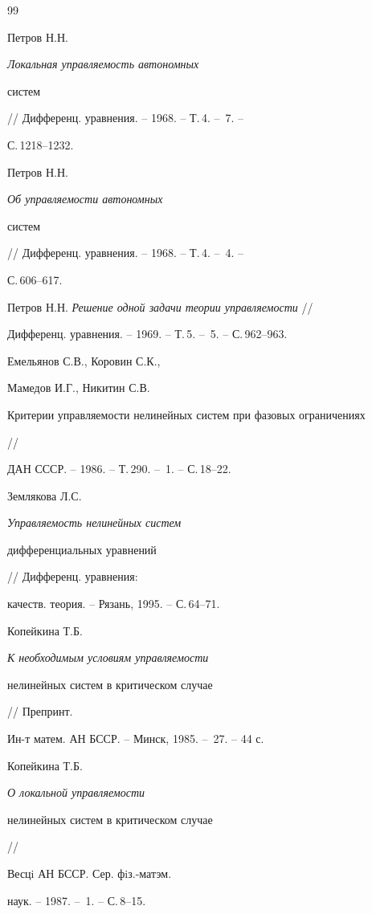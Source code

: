 \begin{thebibliography}{99}







Петров Н.Н. {\em Локальная управляемость автономных


систем} // Дифференц. уравнения. -- 1968. -- Т.\,4. -- \No\,7. --


С.\,1218--1232.




Петров Н.Н. {\em Об управляемости автономных


систем} // Дифференц. уравнения. -- 1968. -- Т.\,4. -- \No\,4. --


С.\,606--617.




Петров Н.Н. {\em Решение одной задачи теории управляемости} //


Дифференц. уравнения. -- 1969. -- Т.\,5. -- \No\,5. -- С.\,962--963.




Емельянов С.В., Коровин С.К.,


Мамедов И.Г., Никитин С.В. {\em


Критерии управляемости нелинейных систем при фазовых ограничениях} //


ДАН СССР. -- 1986. -- Т.\,290. -- \No\,1. -- С.\,18--22.




Землякова Л.С. {\em Управляемость нелинейных систем


дифференциальных уравнений} // Дифференц. уравнения:


качеств. теория. -- Рязань, 1995. -- С.\,64--71.




Копейкина Т.Б. {\em К необходимым условиям управляемости


нелинейных систем в критическом случае} // Препринт.


Ин-т матем. АН БССР. -- Минск, 1985. -- \No\,27. -- 44 с.




Копейкина Т.Б. {\em О локальной управляемости


нелинейных систем в критическом случае} //


Весцi АН БССР. Сер. фiз.-матэм.


наук. -- 1987. -- \No\,1. -- С.\,8--15.





\end{thebibliography}
